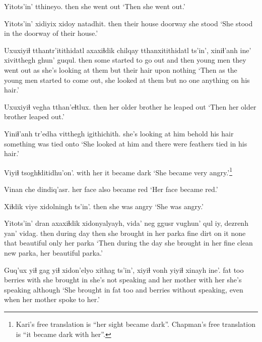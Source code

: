 \documentclass[12pt]{article}
\begin{document}
\gll Yitots'in' tthineyo.
then  {she went out} 
\glt `Then she went out.'
\glend

\gll Yitots'in' xidiyix xidoy natadhit.
then {their house} doorway {she stood}
\glt `She stood in the doorway of their house.'
\glend

\gll Uxuxiyiɬ tthantr'itithidatl axaxiɬdik chilqay tthanxitithidatl ts'in', xiniɬ'anh ine' xivitthegh ghun' guqul.
then  {some started to go out} {and then} {young men} {they went out} as {she's looking at them} but {their hair} upon nothing
\glt `Then as the young men started to come out, she looked at them but no one anything on his hair.'
\glend

\gll Uxuxiyiɬ vegha   tthan'eɬtlux.
then {her older brother} {he leaped out}
\glt `Then her older brother leaped out.'
\glend

\gll Yiniɬ'anh  tr'edha vitthegh igithichith.
{she's looking at him} behold {his hair} {something was tied onto}
\glt `She looked at him and there were feathers tied in his hair.'
\glend

\gll Viyiɬ  tsoghɬditidhu'on'.
{with her} {it became dark}
\glt `She became very angry.'\footnote{Kari's free translation is ``her sight became dark''. Chapman's free translation is ``it became dark with her''.}
\glend

\gll Vinan che dindiq'asr.
{her face} also {became red}
\glt `Her face became red.'
\glend

\gll Xiɬdik {viye xidolningh} ts'in'.
then  {she was angry}
\glt `She was angry.'
\glend

\gll Yitots'in' dran axaxiɬdik xidonyalyayh, vida'  neg ggusr vughun' qul iy, dezrenh yan' vidag.
then  {during day}  then  {she brought in} {her parka} fine dirt {on it} none that beautiful only {her parka}
\glt `Then during the day she brought in her fine clean new parka, her beautiful parka.'
\glend

\gll Guq'ux yiɬ gag yiɬ xidon'elyo {xithag ts'in',} xiyiɬ vonh  yiyiɬ  xinayh ine'.
fat too berries with {she brought in} {she's not speaking} and {her mother} {with her} {she's speaking} although
\glt `She brought in fat too and berries without speaking, even when her mother spoke to her.'
\glend
\end{document}
